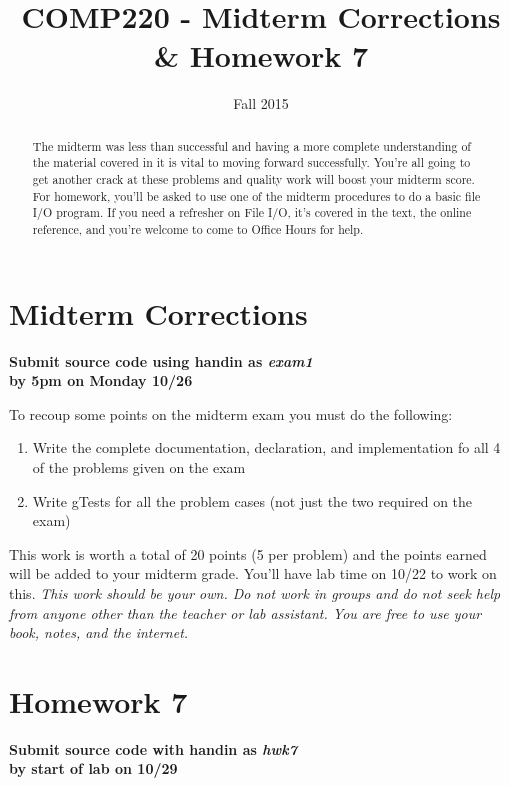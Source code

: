 \documentclass[10pt]{article}
\title{COMP220 - Midterm Corrections \& Homework 7}
\author{ }
\date{Fall 2015}
\begin{document}
\maketitle
\thispagestyle{empty}

\begin{abstract}
The midterm was less than successful and having a more complete understanding of the material covered in it is vital to moving forward successfully. You're all going to get another crack at these problems and quality work will boost your midterm score. For homework, you'll be asked to use one of the midterm procedures to do a basic file I/O program. If you need a refresher on File I/O, it's covered in the text, the online reference, and you're welcome to come to Office Hours for help. 
\end{abstract}

\section{Midterm Corrections}

\begin{center}
\textbf{Submit source code using handin as \textit{exam1} \\ by 5pm on Monday 10/26} 
\end{center}

To recoup some points on the midterm exam you must do the following:
\begin{enumerate}
\item Write the complete documentation, declaration, and implementation fo all 4 of the problems given on the exam
\item Write gTests for all the problem cases (not just the two required on the exam)
\end{enumerate}
This work is worth a total of 20 points (5 per problem) and the points earned will be added to your midterm grade. You'll have lab time on 10/22 to work on this. \textit{This work should be your own. Do not work in groups and do not seek help from anyone other than the teacher or lab assistant. You are free to use your book, notes, and the internet.}

\newpage \thispagestyle{empty}

\section{Homework 7}

\begin{center}
\textbf{Submit source code with handin as \textit{hwk7} \\ by start of lab on 10/29} 
\end{center}
\end{document}
